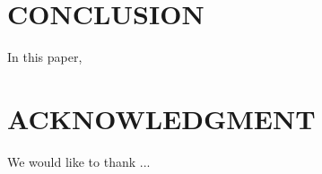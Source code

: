 \documentclass[letterpaper, 10 pt, conference]{ieeeconf}  %
\begin{document}
\section{CONCLUSION}






In this paper, 


\addtolength{\textheight}{-10cm}   %

\section*{ACKNOWLEDGMENT}

We would like to thank ... 





\end{document}
